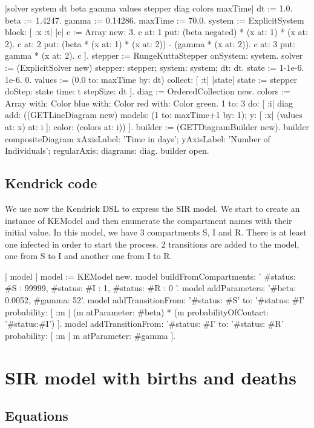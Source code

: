 \documentclass[a4paper,10pt,twoside]{book}
\begin{document}
\begin{code}{}
|solver system dt beta gamma values stepper diag colors maxTime|
dt := 1.0.
beta := 1.4247.
gamma := 0.14286.
maxTime := 70.0.
system := ExplicitSystem block: [ :x :t| |c|
     c := Array new: 3.
     c at: 1 put: (beta negated) * (x at: 1) * (x at: 2).
     c at: 2 put: (beta * (x at: 1) * (x at: 2)) - (gamma * (x at: 2)).
     c at: 3 put: gamma * (x at: 2).
     c
     ].
stepper := RungeKuttaStepper onSystem: system.
solver := (ExplicitSolver new) stepper: stepper; system: system; dt: dt.
state := { 1-1e-6. 1e-6. 0}.
values := (0.0 to: maxTime by: dt) collect: [ :t| |state| state := stepper doStep: state
                                                          time: t stepSize: dt ].
diag := OrderedCollection new.
colors := Array with: Color blue with: Color red with: Color green.
1 to: 3 do: [ :i|
    diag add:
        ((GETLineDiagram new)
            models: (1 to: maxTime+1 by: 1);
            y: [ :x| (values at: x) at: i ];
            color: (colors at: i))
     ].
builder := (GETDiagramBuilder new).
builder compositeDiagram
    xAxisLabel: 'Time in days';
    yAxisLabel: 'Number of Individuals';
    regularAxis;
    diagrams: diag.
builder open.
\end{code}

\subsection{ Kendrick code}
We use now the Kendrick DSL to express the SIR model.
We start to create an instance of KEModel and then enumerate the compartment names with their initial value.
In this model, we have 3 compartments S, I and R.
There is at least one infected in order to start the process.
2 transitions are added to the model, one from S to I and another one from I to R.


\begin{code}{}
| model |
	model := KEModel new.
	model
		buildFromCompartments:
			'{
		{ #status: #S }: 99999,
		{ #status: #I }: 1,
		{ #status: #R }: 0
	}'.
	model addParameters: '{#beta: 0.0052, #gamma: 52}'.
	model
		addTransitionFrom: '{#status: #S}'
		to: '{#status: #I}'
		probability: [ :m | (m atParameter: #beta) * (m probabilityOfContact: '{#status:#I}') ].
	model addTransitionFrom: '{#status: #I}' to: '{#status: #R}' probability: [ :m | m atParameter: #gamma ].
\end{code}

\section{ SIR model with births and deaths}\subsection{ Equations}
\end{document}

